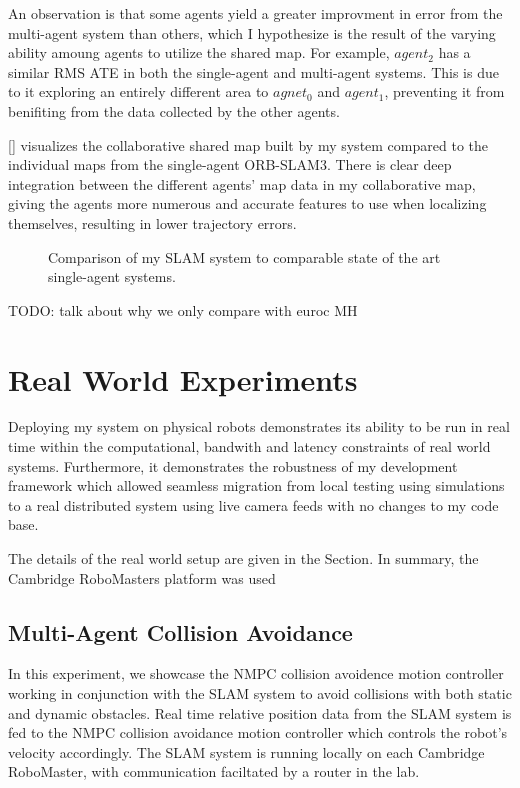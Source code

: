 An observation is that some agents yield a greater improvment in error from the multi-agent system than others, which I hypothesize is the result of the varying ability amoung agents to utilize the shared map. For example, $agent_2$ has a similar RMS ATE in both the single-agent and multi-agent systems. This is due to it exploring an entirely different area to $agnet_0$ and $agent_1$, preventing it from benifiting from the data collected by the other agents.

\autoref{} visualizes the collaborative shared map built by my system compared to the individual maps from the single-agent ORB-SLAM3. There is clear deep integration between the different agents' map data in my collaborative map, giving the agents more numerous and accurate features to use when localizing themselves, resulting in lower trajectory errors.

\begin{figure}[h]
    \centering

    \caption{Comparison of my SLAM system to comparable state of the art single-agent systems.}
    \label{fig:comparison-to-single-agent-systems}
\end{figure}

TODO: talk about why we only compare with euroc MH






\section{Real World Experiments}
\label{sec:real-world-experiments}
Deploying my system on physical robots demonstrates its ability to be run in real time within the computational, bandwith and latency constraints of real world systems. Furthermore, it demonstrates the robustness of my development framework which allowed seamless migration from local testing using simulations to a real distributed system using live camera feeds with no changes to my code base.

The details of the real world setup are given in the  Section. In summary, the Cambridge RoboMasters platform was used

\subsection{Multi-Agent Collision Avoidance}
\label{sec:multi-agent-collision-avoidance}
In this experiment, we showcase the NMPC collision avoidence motion controller working in conjunction with the SLAM system to avoid collisions with both static and dynamic obstacles. Real time relative position data from the SLAM system is fed to the NMPC collision avoidance motion controller which controls the robot's velocity accordingly. The SLAM system is running locally on each Cambridge RoboMaster, with communication faciltated by a router in the lab.

